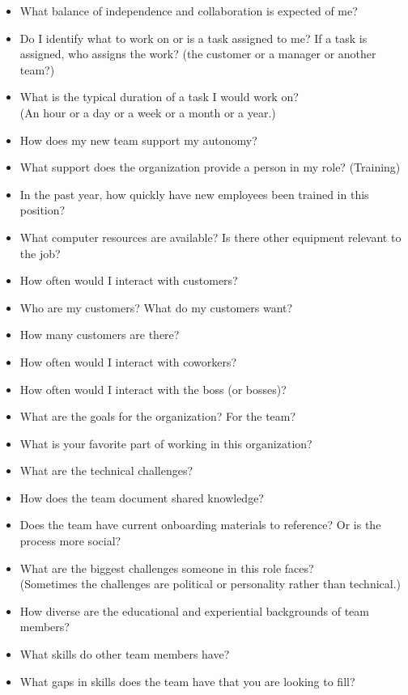 \begin{itemize}
    \item What balance of independence and collaboration is expected of me?
    \item Do I identify what to work on or is a task assigned to me? If a task is assigned, who assigns the work? (the customer or a manager or another team?)
    \item What is the typical duration of a task I would work on? \\
    (An hour or a day or a week or a month or a year.)
    \item How does my new team support my autonomy?
    \item What support does the organization provide a person in my role? (Training)
    \item In the past year, how quickly have new employees been trained in this position?
    \item What computer resources are available? Is there other equipment relevant to the job? 

    \item How often would I interact with customers? 
    \item Who are my customers? What do my customers want?
    \item How many customers are there?
    \item How often would I interact with coworkers? 
    \item How often would I interact with the boss (or bosses)? 
    \item What are the goals for the organization? For the team?

    \item What is your favorite part of working in this organization?

    \item What are the technical challenges?
    \item How does the team document shared knowledge?
    \item Does the team have current onboarding materials to reference? Or is the process more social?
    \item What are the biggest challenges someone in this role faces? \\
    (Sometimes the challenges are political or personality rather than technical.)
    \item How diverse are the educational and experiential backgrounds of team members?
    \item What skills do other team members have?
    \item What gaps in skills does the team have that you are looking to fill?
    

\end{itemize}

